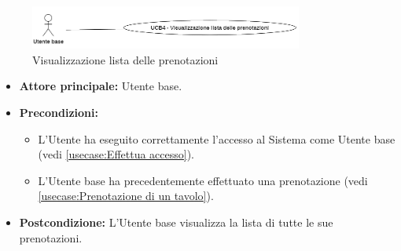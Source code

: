\label{usecase:Visualizzazione lista delle prenotazioni}

\begin{figure}[h]
	\centering
	\includegraphics[width=0.8\textwidth]{./uml/UCB4.png} 
	\caption{Visualizzazione lista delle prenotazioni}
	\label{fig:UCB4}
  \end{figure}

\begin{itemize}
	\item \textbf{Attore principale:} Utente base.

	\item \textbf{Precondizioni:}
	      \begin{itemize}
		      \item L'Utente ha eseguito correttamente l'accesso al Sistema come Utente base (vedi \autoref{usecase:Effettua accesso}).
		      \item L'Utente base ha precedentemente effettuato una prenotazione (vedi \autoref{usecase:Prenotazione di un tavolo}).
	      \end{itemize}


	\item \textbf{Postcondizione:}
	      L'Utente base visualizza la lista di tutte le sue prenotazioni.


\end{itemize}
